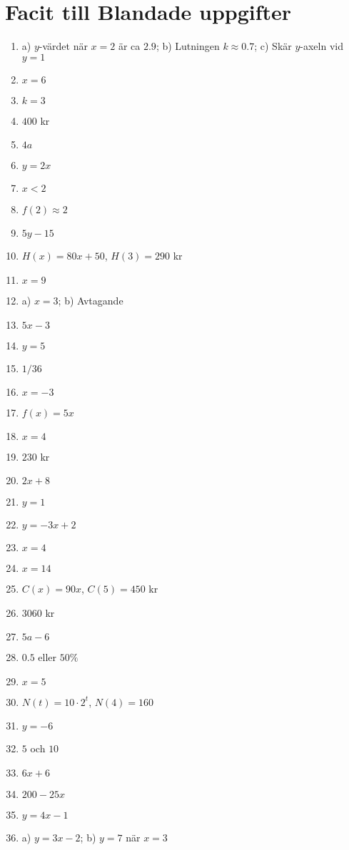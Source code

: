 \documentclass[a4paper,11pt]{article}
\begin{document}
\section*{Facit till Blandade uppgifter}
\begin{enumerate}[label=\textbf{B\arabic*.}]
    \item a) $y$-värdet när $x=2$ är ca $2.9$; b) Lutningen $k \approx 0.7$; c) Skär $y$-axeln vid $y=1$
    \item $x = 6$
    \item $k=3$
    \item $400$ kr
    \item $4a$
    \item $y = 2x$
    \item $x < 2$
    \item $f(2) \approx 2$
    \item $5y - 15$
    \item $H(x) = 80x + 50$, $H(3) = 290$ kr
    \item $x = 9$
    \item a) $x=3$; b) Avtagande
    \item $5x - 3$
    \item $y=5$
    \item $1/36$
    \item $x = -3$
    \item $f(x) = 5x$
    \item $x=4$
    \item $230$ kr
    \item $2x + 8$
    \item $y=1$
    \item $y = -3x + 2$
    \item $x=4$
    \item $x = 14$
    \item $C(x) = 90x$, $C(5) = 450$ kr
    \item $3060$ kr
    \item $5a - 6$
    \item $0.5$ eller $50\%$
    \item $x = 5$
    \item $N(t) = 10 \cdot 2^t$, $N(4) = 160$
    \item $y=-6$
    \item $5$ och $10$
    \item $6x + 6$
    \item $200 - 25x$
    \item $y = 4x - 1$
    \item a) $y = 3x - 2$; b) $y = 7$ när $x=3$
\end{enumerate}
\end{document}
